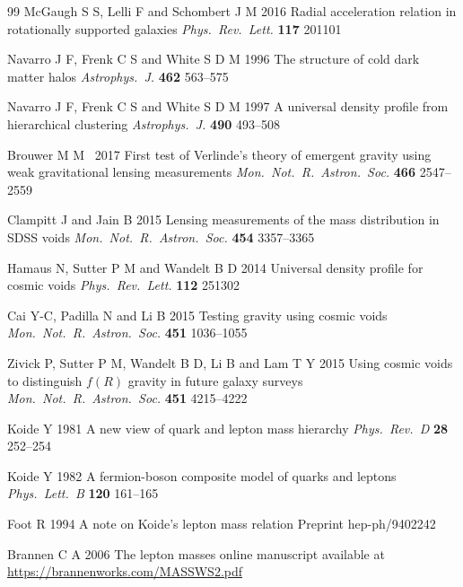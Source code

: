 \documentclass[12pt]{iopart}
\begin{document}
\begin{thebibliography}{99}
McGaugh S S, Lelli F and Schombert J M 2016
Radial acceleration relation in rotationally supported galaxies
\textit{Phys.\ Rev.\ Lett.} \textbf{117} 201101


Navarro J F, Frenk C S and White S D M 1996
The structure of cold dark matter halos
\textit{Astrophys.\ J.} \textbf{462} 563--575

Navarro J F, Frenk C S and White S D M 1997
A universal density profile from hierarchical clustering
\textit{Astrophys.\ J.} \textbf{490} 493--508


Brouwer M M \etal\ 2017
First test of Verlinde's theory of emergent gravity using weak gravitational lensing measurements
\textit{Mon.\ Not.\ R.\ Astron.\ Soc.} \textbf{466} 2547--2559


Clampitt J and Jain B 2015
Lensing measurements of the mass distribution in SDSS voids
\textit{Mon.\ Not.\ R.\ Astron.\ Soc.} \textbf{454} 3357--3365

Hamaus N, Sutter P M and Wandelt B D 2014
Universal density profile for cosmic voids
\textit{Phys.\ Rev.\ Lett.} \textbf{112} 251302

Cai Y-C, Padilla N and Li B 2015
Testing gravity using cosmic voids
\textit{Mon.\ Not.\ R.\ Astron.\ Soc.} \textbf{451} 1036--1055

Zivick P, Sutter P M, Wandelt B D, Li B and Lam T Y 2015
Using cosmic voids to distinguish \(f(R)\) gravity in future galaxy surveys
\textit{Mon.\ Not.\ R.\ Astron.\ Soc.} \textbf{451} 4215--4222


Koide Y 1981
A new view of quark and lepton mass hierarchy
\textit{Phys.\ Rev.\ D} \textbf{28} 252--254

Koide Y 1982
A fermion-boson composite model of quarks and leptons
\textit{Phys.\ Lett.\ B} \textbf{120} 161--165

Foot R 1994
A note on Koide's lepton mass relation
Preprint hep-ph/9402242

Brannen C A 2006
The lepton masses
online manuscript
available at \url{https://brannenworks.com/MASSWS2.pdf}


\end{thebibliography}
\end{document}
